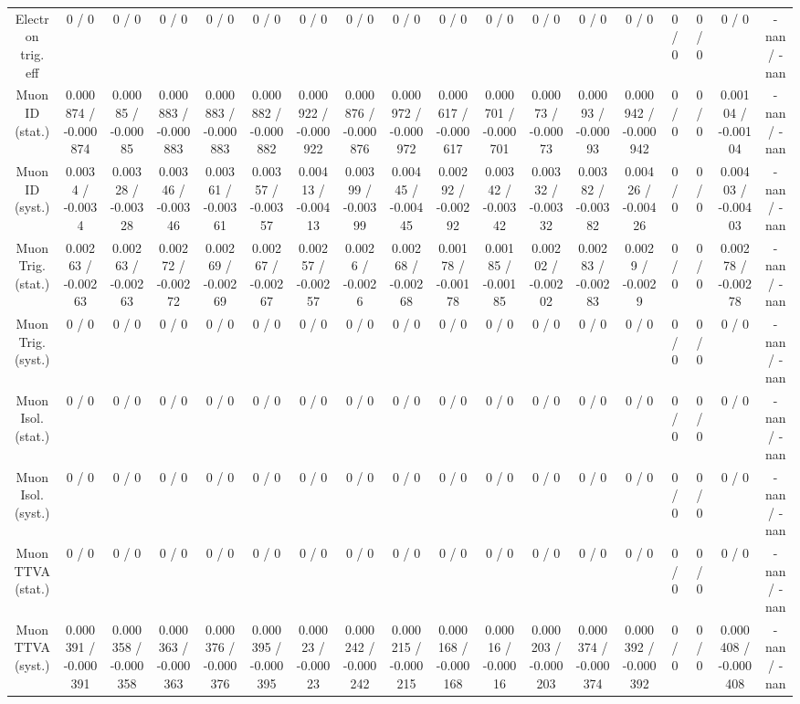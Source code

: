 \documentclass[10pt]{article}
\begin{document}
\begin{table}[htbp]
\begin{center}
\begin{tabular}{|c|c|c|c|c|c|c|c|c|c|c|c|c|c|c|c|c|c|}
  Electron trig. eff & 0 / 0 & 0 / 0 & 0 / 0 & 0 / 0 & 0 / 0 & 0 / 0 & 0 / 0 & 0 / 0 & 0 / 0 & 0 / 0 & 0 / 0 & 0 / 0 & 0 / 0 & 0 / 0 & 0 / 0 & 0 / 0 & -nan / -nan \\ 
  Muon ID (stat.) & 0.000874 / -0.000874 & 0.00085 / -0.00085 & 0.000883 / -0.000883 & 0.000883 / -0.000883 & 0.000882 / -0.000882 & 0.000922 / -0.000922 & 0.000876 / -0.000876 & 0.000972 / -0.000972 & 0.000617 / -0.000617 & 0.000701 / -0.000701 & 0.00073 / -0.00073 & 0.00093 / -0.00093 & 0.000942 / -0.000942 & 0 / 0 & 0 / 0 & 0.00104 / -0.00104 & -nan / -nan \\ 
  Muon ID (syst.) & 0.0034 / -0.0034 & 0.00328 / -0.00328 & 0.00346 / -0.00346 & 0.00361 / -0.00361 & 0.00357 / -0.00357 & 0.00413 / -0.00413 & 0.00399 / -0.00399 & 0.00445 / -0.00445 & 0.00292 / -0.00292 & 0.00342 / -0.00342 & 0.00332 / -0.00332 & 0.00382 / -0.00382 & 0.00426 / -0.00426 & 0 / 0 & 0 / 0 & 0.00403 / -0.00403 & -nan / -nan \\ 
  Muon Trig. (stat.) & 0.00263 / -0.00263 & 0.00263 / -0.00263 & 0.00272 / -0.00272 & 0.00269 / -0.00269 & 0.00267 / -0.00267 & 0.00257 / -0.00257 & 0.0026 / -0.0026 & 0.00268 / -0.00268 & 0.00178 / -0.00178 & 0.00185 / -0.00185 & 0.00202 / -0.00202 & 0.00283 / -0.00283 & 0.0029 / -0.0029 & 0 / 0 & 0 / 0 & 0.00278 / -0.00278 & -nan / -nan \\ 
  Muon Trig. (syst.) & 0 / 0 & 0 / 0 & 0 / 0 & 0 / 0 & 0 / 0 & 0 / 0 & 0 / 0 & 0 / 0 & 0 / 0 & 0 / 0 & 0 / 0 & 0 / 0 & 0 / 0 & 0 / 0 & 0 / 0 & 0 / 0 & -nan / -nan \\ 
  Muon Isol. (stat.) & 0 / 0 & 0 / 0 & 0 / 0 & 0 / 0 & 0 / 0 & 0 / 0 & 0 / 0 & 0 / 0 & 0 / 0 & 0 / 0 & 0 / 0 & 0 / 0 & 0 / 0 & 0 / 0 & 0 / 0 & 0 / 0 & -nan / -nan \\ 
  Muon Isol. (syst.) & 0 / 0 & 0 / 0 & 0 / 0 & 0 / 0 & 0 / 0 & 0 / 0 & 0 / 0 & 0 / 0 & 0 / 0 & 0 / 0 & 0 / 0 & 0 / 0 & 0 / 0 & 0 / 0 & 0 / 0 & 0 / 0 & -nan / -nan \\ 
  Muon TTVA (stat.) & 0 / 0 & 0 / 0 & 0 / 0 & 0 / 0 & 0 / 0 & 0 / 0 & 0 / 0 & 0 / 0 & 0 / 0 & 0 / 0 & 0 / 0 & 0 / 0 & 0 / 0 & 0 / 0 & 0 / 0 & 0 / 0 & -nan / -nan \\ 
  Muon TTVA (syst.) & 0.000391 / -0.000391 & 0.000358 / -0.000358 & 0.000363 / -0.000363 & 0.000376 / -0.000376 & 0.000395 / -0.000395 & 0.00023 / -0.00023 & 0.000242 / -0.000242 & 0.000215 / -0.000215 & 0.000168 / -0.000168 & 0.00016 / -0.00016 & 0.000203 / -0.000203 & 0.000374 / -0.000374 & 0.000392 / -0.000392 & 0 / 0 & 0 / 0 & 0.000408 / -0.000408 & -nan / -nan \\ 

\end{tabular}
\end{center}
\end{table}
\end{document}

